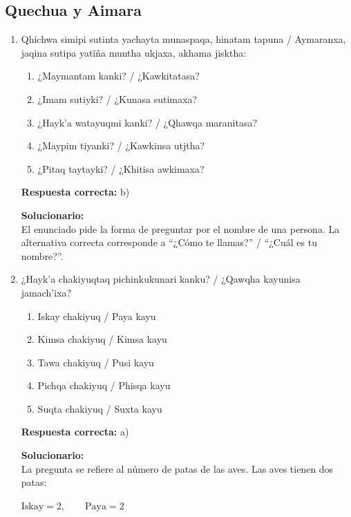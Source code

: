 \subsection*{Quechua y Aimara}

\begin{enumerate}
	
	\item Qhichwa simipi sutinta yachayta munaspaqa, hinatam tapuna / Aymaranxa, jaqina sutipa yatïña muntha ukjaxa, akhama jisktha:
	\begin{enumerate}[label=\alph*)]
		\item ¿Maymantam kanki? / ¿Kawkitatasa?
		\item ¿Imam sutiyki? / ¿Kunasa sutimaxa?
		\item ¿Hayk’a watayuqmi kanki? / ¿Qhawqa maranitasa?
		\item ¿Maypim tiyanki? / ¿Kawkinsa utjtha?
		\item ¿Pitaq taytayki? / ¿Khitisa awkimaxa?
	\end{enumerate}
	\textbf{Respuesta correcta:} b)
	
	\vspace{2mm}
	\textbf{Solucionario:}\\
	El enunciado pide la forma de preguntar por el nombre de una persona. La alternativa correcta corresponde a “¿Cómo te llamas?” / “¿Cuál es tu nombre?”.
	
	\vspace{6mm}
	
	\item ¿Hayk’a chakiyuqtaq pichinkukunari kanku? / ¿Qawqha kayunisa jamach’ixa?
	\begin{enumerate}[label=\alph*)]
		\item Iskay chakiyuq / Paya kayu
		\item Kimsa chakiyuq / Kimsa kayu
		\item Tawa chakiyuq / Pusi kayu
		\item Pichqa chakiyuq / Phisqa kayu
		\item Suqta chakiyuq / Suxta kayu
	\end{enumerate}
	\textbf{Respuesta correcta:} a)
	
	\vspace{2mm}
	\textbf{Solucionario:}\\
	La pregunta se refiere al número de patas de las aves. Las aves tienen dos patas:
	
	$\text{Iskay} = 2,\qquad \text{Paya} = 2$
	

	
	\vspace{6mm}
	
\end{enumerate}










